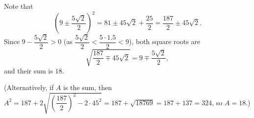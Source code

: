 Note that
\[\left(9\pm\dfrac{5\sqrt2}{2}\right)^2=81\pm45\sqrt2+\dfrac{25}{2}=\dfrac{187}{2}\pm45\sqrt2.\]
Since $9-\dfrac{5\sqrt2}{2}>0$ (as $\dfrac{5\sqrt2}2<\dfrac{5\cdot1.5}{2}<9$), both square roots are
\[\sqrt{\dfrac{187}{2}\mp45\sqrt2}=9\mp\dfrac{5\sqrt2}{2},\]
and their sum is $\boxed{18}$.

(Alternatively, if $A$ is the sum, then $A^2=187+2\sqrt{\left(\dfrac{187}{2}\right)^2-2\cdot45^2}=187+\sqrt{18769}=187+137=324$, so $A=18$.)
